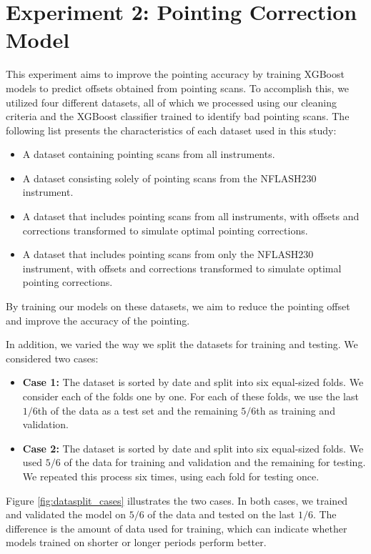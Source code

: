 \section{Experiment 2: Pointing Correction Model}
This experiment aims to improve the pointing accuracy by training XGBoost models to predict offsets obtained from pointing scans.
To accomplish this, we utilized four different datasets, all of which we processed using our cleaning criteria and the XGBoost classifier trained to identify bad pointing scans.
The following list presents the characteristics of each dataset used in this study:
\begin{itemize}
\item A dataset containing pointing scans from all instruments.
\item A dataset consisting solely of pointing scans from the NFLASH230 instrument.
\item A dataset that includes pointing scans from all instruments, with offsets and corrections transformed to simulate optimal pointing corrections.
\item A dataset that includes pointing scans from only the NFLASH230 instrument, with offsets and corrections transformed to simulate optimal pointing corrections.
\end{itemize}

By training our models on these datasets, we aim to reduce the pointing offset and improve the accuracy of the pointing.

In addition, we varied the way we split the datasets for training and testing.
We considered two cases:

\begin{itemize}
    \item \textbf{Case 1:} The dataset is sorted by date and split into six equal-sized folds.
    We consider each of the folds one by one.
    For each of these folds, we use the last $1/6$th of the data as a test set and the remaining $5/6$th as training and validation.
    \item \textbf{Case 2:} The dataset is sorted by date and split into six equal-sized folds.
    We used $5/6$ of the data for training and validation and the remaining for testing.
    We repeated this process six times, using each fold for testing once.
\end{itemize}

Figure \ref{fig:datasplit_cases} illustrates the two cases.
In both cases, we trained and validated the model on $5/6$ of the data and tested on the last $1/6$.
The difference is the amount of data used for training, which can indicate whether models trained on shorter or longer periods perform better.

